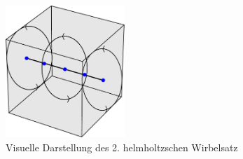 \begin{figure}
\centering
\includegraphics[width=0.4\textwidth]{papers/wirbelringe/fig/cube_still_particles_rotation.pdf}
\caption{Visuelle Darstellung des 2. helmholtzschen Wirbelsatz \label{buch:papers:Wirbelringe:fig:Helmholtz_2}}
\end{figure}